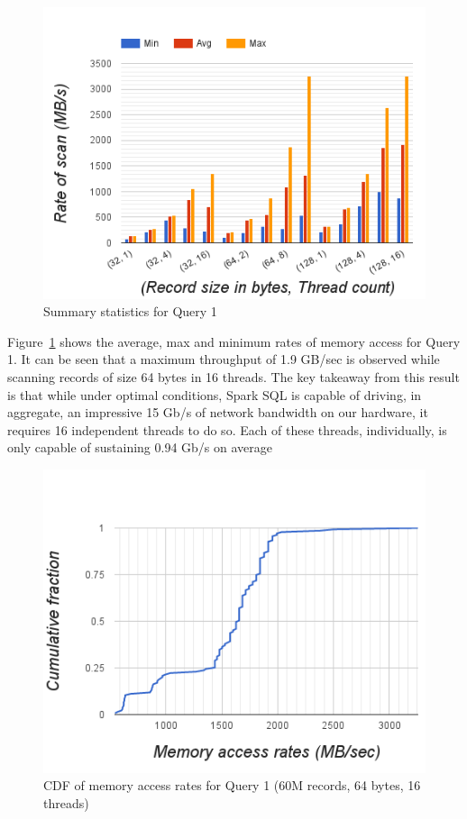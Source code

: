\documentclass[9pt]{sig-alternate-05-2015}
\begin{document}
\begin{figure}[h]
\centering
\includegraphics[width=\columnwidth]{mem-scan-summary-statistics}
\caption{\label{fig:stat_query1}Summary statistics for Query 1}
\end{figure}

Figure~\ref{fig:stat_query1} shows the average, max and minimum rates of memory
access for Query 1. It can be seen that a maximum throughput of 1.9 GB/sec is
observed while scanning records of size 64 bytes in 16 threads.  The key
takeaway from this result is that while under optimal conditions, Spark SQL is
capable of driving, in aggregate, an impressive 15 Gb/s of network bandwidth on
our hardware, it requires 16 independent threads to do so.  Each of these
threads, individually, is only capable of sustaining 0.94 Gb/s on average

\begin{figure}[h]
\centering
\includegraphics[width=\columnwidth]{cdf-mem-access-rates-count-64bytes-16threads}
\caption{\label{fig:mem_query1}CDF of memory access rates for Query 1 (60M records, 64 bytes, 16 threads)}
\end{figure}
\end{document}
